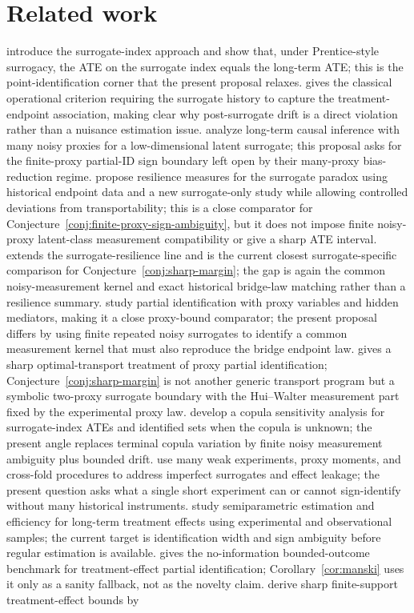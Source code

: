 \documentclass[11pt]{article}
\theoremstyle{definition}
\theoremstyle{plain}
\theoremstyle{remark}
\begin{document}
\section{Related work}
\citet{AtheyChettyImbensKang2019} introduce the surrogate-index approach and show that, under Prentice-style surrogacy, the ATE on the surrogate index equals the long-term ATE; this is the point-identification corner that the present proposal relaxes.  \citet{Prentice1989} gives the classical operational criterion requiring the surrogate history to capture the treatment-endpoint association, making clear why post-surrogate drift is a direct violation rather than a nuisance estimation issue.  \citet{LalImbensHull2026} analyze long-term causal inference with many noisy proxies for a low-dimensional latent surrogate; this proposal asks for the finite-proxy partial-ID sign boundary left open by their many-proxy bias-reduction regime.  \citet{HsiaoTianParast2025} propose resilience measures for the surrogate paradox using historical endpoint data and a new surrogate-only study while allowing controlled deviations from transportability; this is a close comparator for Conjecture~\ref{conj:finite-proxy-sign-ambiguity}, but it does not impose finite noisy-proxy latent-class measurement compatibility or give a sharp ATE interval.  \citet{HsiaoParast2026} extends the surrogate-resilience line and is the current closest surrogate-specific comparison for Conjecture~\ref{conj:sharp-margin}; the gap is again the common noisy-measurement kernel and exact historical bridge-law matching rather than a resilience summary.  \citet{GhassamiShpitserTchetgen2023} study partial identification with proxy variables and hidden mediators, making it a close proxy-bound comparator; the present proposal differs by using finite repeated noisy surrogates to identify a common measurement kernel that must also reproduce the bridge endpoint law.  \citet{Li2026} gives a sharp optimal-transport treatment of proxy partial identification; Conjecture~\ref{conj:sharp-margin} is not another generic transport program but a symbolic two-proxy surrogate boundary with the Hui--Walter measurement part fixed by the experimental proxy law.  \citet{FanManzanaresParkQi2026} develop a copula sensitivity analysis for surrogate-index ATEs and identified sets when the copula is unknown; the present angle replaces terminal copula variation by finite noisy measurement ambiguity plus bounded drift.  \citet{BibautKallusEjdemyrZhao2023} use many weak experiments, proxy moments, and cross-fold procedures to address imperfect surrogates and effect leakage; the present question asks what a single short experiment can or cannot sign-identify without many historical instruments.  \citet{ChenRitzwoller2023} study semiparametric estimation and efficiency for long-term treatment effects using experimental and observational samples; the current target is identification width and sign ambiguity before regular estimation is available.  \citet{Manski1990} gives the no-information bounded-outcome benchmark for treatment-effect partial identification; Corollary~\ref{cor:manski} uses it only as a sanity fallback, not as the novelty claim.  \citet{BalkePearl1997} derive sharp finite-support treatment-effect bounds by 
\end{document}
